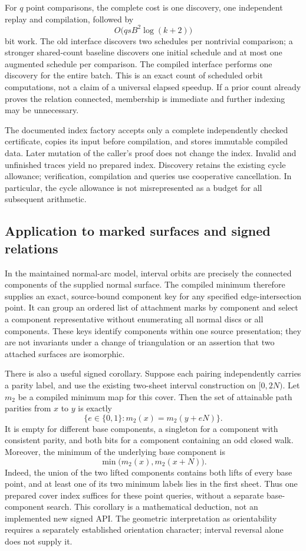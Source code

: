 For $q$ point comparisons, the complete cost is one discovery, one
independent replay and compilation, followed by
\[
 O\bigl(qs B^2\log(k+2)\bigr)
\]
bit work.  The old interface discovers two schedules per nontrivial
comparison; a stronger shared-count baseline discovers one initial schedule
and at most one augmented schedule per comparison.  The compiled interface
performs one discovery for the entire batch.  This is an exact count of
scheduled orbit computations, not a claim of a universal elapsed speedup.
If a prior count already proves the relation connected, membership is
immediate and further indexing may be unnecessary.

The documented index factory accepts only a complete independently checked
certificate, copies its input before compilation, and stores immutable
compiled data.  Later mutation of the caller's proof does not change the
index.  Invalid and unfinished traces yield no prepared index.  Discovery
retains the existing cycle allowance; verification, compilation and queries
use cooperative cancellation.  In particular, the cycle allowance is not
misrepresented as a budget for all subsequent arithmetic.

\subsection{Application to marked surfaces and signed relations}

In the maintained normal-arc model, interval orbits are precisely the
connected components of the supplied normal surface.  The compiled minimum
therefore supplies an exact, source-bound component key for any specified
edge-intersection point.  It can group an ordered list of attachment marks
by component and select a component representative without enumerating all
normal discs or all components.  These keys identify components within
one source presentation; they are not invariants under a change of
triangulation or an assertion that two attached surfaces are isomorphic.

There is also a useful signed corollary.  Suppose each pairing independently
carries a parity label, and use the existing two-sheet interval construction
on $[0,2N)$.  Let $m_2$ be a compiled minimum map for this cover.  Then the
set of attainable path parities from $x$ to $y$ is exactly
\[
 \{e\in\{0,1\}:m_2(x)=m_2(y+eN)\}.
\]
It is empty for different base components, a singleton for a component with
consistent parity, and both bits for a component containing an odd closed
walk.  Moreover, the minimum of the underlying base component is
\[
 \min\bigl(m_2(x),m_2(x+N)\bigr).
\]
Indeed, the union of the two lifted components contains both lifts of every
base point, and at least one of its two minimum labels lies in the first
sheet.  Thus one prepared cover index suffices for these point queries,
without a separate base-component search.  This corollary is a mathematical
deduction, not an implemented new signed API.  The geometric interpretation
as orientability requires a separately established orientation character;
interval reversal alone does not supply it.

